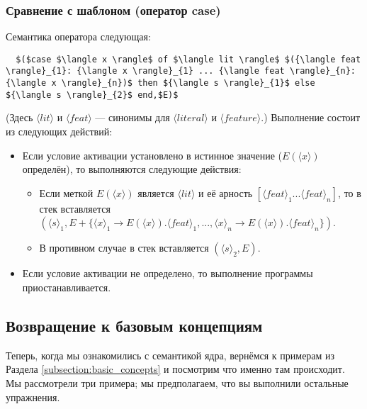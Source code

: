 \subsubsection{Сравнение с шаблоном (оператор case)}

Семантика оператора следующая:

\begin{lstlisting}
  $($case $\langle x \rangle$ of $\langle lit \rangle$ $({\langle feat \rangle}_{1}: {\langle x \rangle}_{1} ... {\langle feat \rangle}_{n}: {\langle x \rangle}_{n})$ then ${\langle s \rangle}_{1}$ else ${\langle s \rangle}_{2}$ end,$E)$
\end{lstlisting}

(Здесь $\langle lit \rangle$ и $\langle feat \rangle$ --- синонимы для $\langle literal \rangle$ и $\langle feature \rangle$.) Выполнение состоит из следующих действий:

\begin{itemize}
\item{Если условие активации установлено в истинное значение ($E( \langle x \rangle)$ определён), то выполняются следующие действия:

  \begin{itemize}
\item{Если меткой $E( \langle x \rangle)$ является $\langle lit \rangle$ и её арность $[ {\langle feat \rangle}_{1} ... {\langle feat \rangle}_{n}]$, то в стек вставляется $({ \langle s \rangle}_{1},E+ \{ { \langle x \rangle }_{1} \to E(\langle x \rangle).{ \langle feat \rangle }_{1}, ..., { \langle x \rangle }_{n} \to E(\langle x \rangle).{ \langle feat \rangle }_{n} \})$.}

\item{В противном случае в стек вставляется $( { \langle s \rangle }_{2},E)$.}
  \end{itemize}
}

\item{Если условие активации не определено, то выполнение программы приостанавливается.}
\end{itemize}

\subsection{Возвращение к базовым концепциям}

Теперь, когда мы ознакомились с семантикой ядра, вернёмся к примерам из Раздела \ref{subsection:basic_concepts} и посмотрим что именно там происходит. Мы рассмотрели три примера; мы предполагаем, что вы выполнили остальные упражнения.

